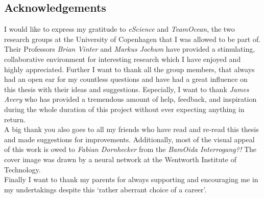 \begin{vplace}[0.5]
\section*{Acknowledgements}%
\label{sec:acknowledgements}

I would like to express my gratitude to {\em eScience} and {\em TeamOcean}, the
two research groups at the University of Copenhagen that I was allowed to be
part of. Their Professors {\em Brian Vinter} and {\em Markus Jochum} have
provided a stimulating, collaborative environment for interesting research
which I have enjoyed and highly appreciated. Further I want to thank all the
group members, that always had an open ear for my countless questions and have
had a great influence on this thesis with their ideas and suggestions.
Especially, I want to thank {\em James Avery} who has provided a tremendous
amount of help, feedback, and inspiration during the whole duration of this
project without ever expecting anything in return.\\

A big thank you also goes to all my friends who have read and re-read this
thesis and made suggestions for improvements. Additionally, most of the visual
appeal of this work is owed to {\em Fabian Dornhecker} from the {\em BamOida
Interrogang\rlap?!} The cover image was drawn by a neural network at the
Wentworth Institute of Technology.\\

Finally I want to thank my parents for always supporting and encouraging me in 
my undertakings despite this `rather aberrant choice of a career'.
\end{vplace}
